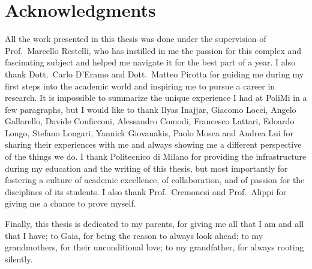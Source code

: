 \chapter*{Acknowledgments}



All the work presented in this thesis was done under the supervision of 
Prof.\ Marcello Restelli, who has instilled in me the passion for this complex 
and fascinating subject and helped me navigate it for the best part of a year. 
I also thank Dott.\ Carlo D'Eramo and Dott.\ Matteo Pirotta for guiding 
me during my first steps into the academic world and inspiring me to pursue a 
career in research. 
It is impossible to summarize the unique experience I had at PoliMi in a few
paragraphs, but I would like to thank Ilyas Inajjar, Giacomo Locci, Angelo 
Gallarello, Davide Conficconi, Alessandro Comodi, Francesco Lattari, Edoardo
Longo, Stefano Longari, Yannick Giovanakis, Paolo Mosca and Andrea Lui for 
sharing their experiences with me and always showing me a different perspective
of the things we do. 
I thank Politecnico di Milano for providing the infrastructure during my education
and the writing of this thesis, but most importantly for fostering a culture 
of academic excellence, of collaboration, and of passion for the disciplines
of its students.
I also thank Prof.\ Cremonesi and Prof.\ Alippi for giving me a chance to prove 
myself.

Finally, this thesis is dedicated to my parents, for giving me all that I am and
all that I have; 
to Gaia, for being the reason to always look ahead;
to my grandmothers, for their unconditional love; 
to my grandfather, for always rooting silently.